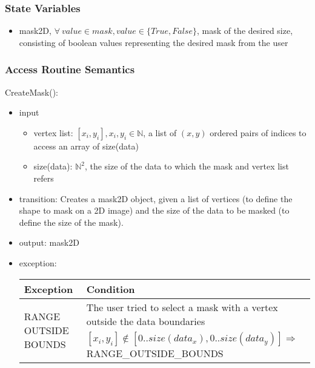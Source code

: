 \documentclass[12pt, titlepage]{article}
\begin{document}
\subsubsection{State Variables}
\begin{itemize}
    \item mask2D, $\forall\ value \in mask, value \in \{True,False\}$, mask of
    the desired size, consisting of boolean values representing the desired mask
    from the user
\end{itemize}

\subsubsection{Access Routine Semantics}

\noindent CreateMask():
\begin{itemize}
    \item input
    \begin{itemize}
        \item vertex list: $[x_i, y_i], x_i, y_i \in \mathbb{N}$, a list of
        $(x,y)$ ordered pairs of indices to access an array of size(data)
        \item size(data): $\mathbb{N}^2$, the size of the data to which the mask
        and vertex list refers
    \end{itemize}
    \item transition: Creates a mask2D object, given a list of vertices (to
    define the shape to mask on a 2D image) and the size of the data to be
    masked (to define the size of the mask).
    \item output: mask2D
    \item exception:
    \begin{center}
        \begin{tabular}{p{3.5cm} p{12cm}}
            \toprule[0.15em]
            \textbf{Exception} & \textbf{Condition}\\
            \midrule[0.1em]
            \multirow{2}{0.25\textwidth}{RANGE OUTSIDE BOUNDS} & The user tried
            to select a mask with a vertex outside the data boundaries\\ 
            & $[x_i, y_i] \notin [0..size(data_x), 0..size(data_y)] \Rightarrow$
            RANGE\_OUTSIDE\_BOUNDS\\ 
            \bottomrule[0.15em]
        \end{tabular}
    \end{center}
\end{itemize}
\end{document}
